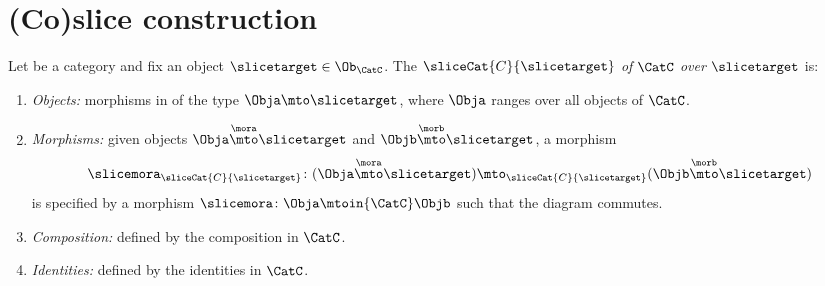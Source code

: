 
\section{(Co)slice construction}



\begin{ctdefinition}
\label{def:slice-category}
   
    Let \CatC be a category and fix an object $\slicetarget \in \Ob_\CatC$. The  $\sliceCat{C}{\slicetarget}$ \emph{of} $\CatC$ \emph{over} $\slicetarget$ is: 
    \begin{enumerate}
        \item \emph{Objects:} morphisms in \CatC of the type $\Obja \mto \slicetarget$, where $\Obja$ ranges over all objects of $\CatC$. 
        \item \emph{Morphisms:} given objects $\Obja \overset{\mora}{\mto} \slicetarget$ and $\Objb \overset{\morb}{\mto} \slicetarget$, a morphism 
        \begin{equation}
\slicemora_{\sliceCat{C}{\slicetarget}} \colon (\Obja \overset{\mora}{\mto} \slicetarget) \mto_{\sliceCat{C}{\slicetarget}} (\Objb \overset{\morb}{\mto} \slicetarget)
\end{equation}
is specified by a morphism $\slicemora \colon \Obja \mtoin{\CatC} \Objb$ such that the diagram
commutes. 

\item \emph{Composition:} defined by the composition in $\CatC$.  
\item \emph{Identities:} defined by the identities in $\CatC$. 
\end{enumerate}
\end{ctdefinition}




